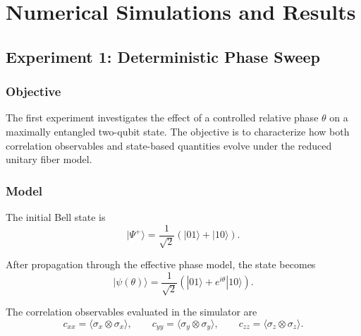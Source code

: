 \documentclass[a4paper]{article}
\begin{document}
\section{Numerical Simulations and Results}



\subsection{Experiment 1: Deterministic Phase Sweep}


\subsubsection{Objective}

The first experiment investigates the effect of a controlled relative phase \( \theta \) on a maximally entangled two-qubit state. The objective is to characterize how both correlation observables and state-based quantities evolve under the reduced unitary fiber model.


\subsubsection{Model}

The initial Bell state is
\[
|\Psi^{+}\rangle
=
\frac{1}{\sqrt{2}}
\left(
|01\rangle + |10\rangle
\right).
\]

After propagation through the effective phase model, the state becomes
\[
|\psi(\theta)\rangle
=
\frac{1}{\sqrt{2}}
\left(
|01\rangle + e^{i\theta}|10\rangle
\right).
\]

The correlation observables evaluated in the simulator are
\[
c_{xx} = \langle \sigma_x \otimes \sigma_x \rangle,\qquad
c_{yy} = \langle \sigma_y \otimes \sigma_y \rangle,\qquad
c_{zz} = \langle \sigma_z \otimes \sigma_z \rangle.
\]

\end{document}
